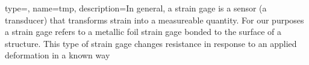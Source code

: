 {
type=\thisgls,
name={tmp},
description={In general, a strain gage is a sensor (a transducer) that transforms strain into a measureable quantity.  For our purposes a strain gage refers to a metallic foil strain gage bonded to the surface of a structure.  This type of strain gage changes resistance in response to an applied deformation in a known way}
}



